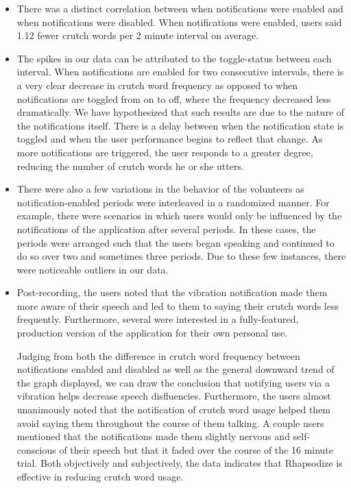 \documentclass{sigchi}
\begin{document}
\begin{itemize}
\item There was a distinct correlation between when notifications were enabled and when notifications were disabled. When notifications were enabled, users said 1.12 fewer crutch words per 2 minute interval on average.
\item The spikes in our data can be attributed to the toggle-status between each interval. When notifications are enabled for two consecutive intervals, there is a very clear decrease in crutch word frequency as opposed to when notifications are toggled from on to off, where the frequency decreased less dramatically. We have hypothesized that such results are due to the nature of the notifications itself. There is a delay between when the notification state is toggled and when the user performance begins to reflect that change. As more notifications are triggered, the user responds to a greater degree, reducing the number of crutch words he or she utters.
\item There were also a few variations in the behavior of the volunteers as notification-enabled periods were interleaved in a randomized manner. For example, there were scenarios in which users would only be influenced by the notifications of the application after several periods. In these cases, the periods were arranged such that the users began speaking and continued to do so over two and sometimes three periods. Due to these few instances, there were noticeable outliers in our data.
\item Post-recording, the users noted that the vibration notification made them more aware of their speech and led to them to saying their crutch words less frequently. Furthermore, several were interested in a fully-featured, production version of the application for their own personal use.

Judging from both the difference in crutch word frequency between notifications enabled and disabled as well as the general downward trend of the graph displayed, we can draw the conclusion that notifying users via  a vibration helps decrease speech disfluencies. Furthermore, the users almost unanimously noted that the notification of crutch word usage helped them avoid saying them throughout the course of them talking. A couple users mentioned that the notifications made them slightly nervous and self-conscious of their speech but that it faded over the course of the 16 minute trial. Both objectively and subjectively, the data indicates that Rhapsodize is effective in reducing crutch word usage.
\end{itemize}
\end{document}
